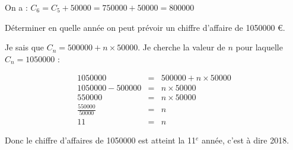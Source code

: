 \begin{questions}
\begin{parts}
\begin{solution}
			On a : $C_6 = C_5 + \num{50000} =  \num{750000} + \num{50000} = \num{800000}$
		\end{solution}
	\end{parts}	
	
	\question[2] Déterminer en quelle année on peut prévoir un chiffre d'affaire de \num{1050000} €.
	\begin{solution}
		Je sais que $C_n = \num{500000} + n \times \num{50000}$.
		Je cherche la valeur de $n$ pour laquelle $C_n = \num{1050000}$ :
		
		\begin{eqnarray*}
			\num{1050000} &  = & \num{500000} + n \times \num{50000} \\
			\num{1050000} - \num{500000} & = & n \times \num{50000} \\
			\num{550000} & = & n \times \num{50000} \\
			\frac{\num{550000}}{\num{50000}} & = & n \\
			11 &=& n			
		\end{eqnarray*}
	
		Donc le chiffre d'affaires de \num{1050000} est atteint la 11$^e$ année, c'est à dire 2018.
	\end{solution}
	
\end{questions}